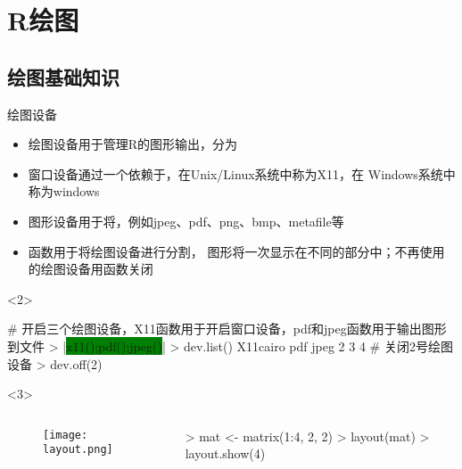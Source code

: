 
\section{R绘图}
\subsection{绘图基础知识}
\begin{frame}[t, fragile]{\subsecname}{绘图设备}
  \begin{itemize}
  \item<1-> 绘图设备用于管理R的图形输出，分为
  \item<2-> 窗口设备通过一个依赖于，在Unix/Linux系统中称为X11，在
        Windows系统中称为windows
  \item<2-> 图形设备用于将，例如jpeg、pdf、png、bmp、metafile等
  \item<3-> 函数用于将绘图设备进行分割，
            图形将一次显示在不同的部分中；不再使用的绘图设备用函数关闭 
  \end{itemize} 

\begin{overlayarea}{\textwidth}{\textheight}
\begin{onlyenv}<2>
\begin{rcode}
# 开启三个绘图设备，X11函数用于开启窗口设备，pdf和jpeg函数用于输出图形到文件
> |\colorbox{green}{x11();pdf();jpeg()}|
> dev.list()
X11cairo      pdf     jpeg 
       2        3        4 
# 关闭2号绘图设备
> dev.off(2) 
\end{rcode}  
\end{onlyenv}

\begin{onlyenv}<3>
      \begin{columns}
        \begin{column}{.4\textwidth}
          \begin{figure}
            \centering
            \texttt{[image: layout.png]}
          \end{figure}
        \end{column}

        \begin{column}{.6\textwidth}
 \centering
\begin{rcode}
> mat <- matrix(1:4, 2, 2)
> layout(mat)
> layout.show(4)
\end{rcode}
        \end{column}
      \end{columns}
\end{onlyenv}


\end{overlayarea}
\end{frame}

